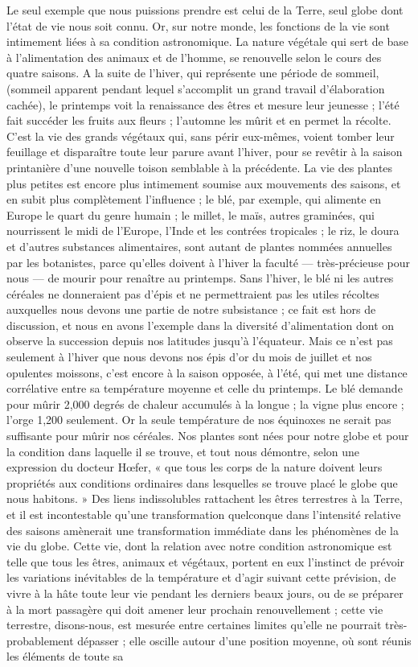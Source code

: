 \documentclass[a4paper, 11pt, oneside, landscape]{article}
\begin{document}
Le seul exemple que nous puissions prendre est celui de la Terre, seul globe dont l'état de vie nous soit connu. Or, sur notre monde, les fonctions de la vie sont intimement liées à sa condition astronomique. La nature végétale qui sert de base à l'alimentation des animaux et de l'homme, se renouvelle selon le cours des quatre saisons. A la suite de l'hiver, qui représente une période de sommeil, (sommeil apparent pendant lequel s'accomplit un grand travail d'élaboration cachée), le printemps voit la renaissance des êtres et mesure leur jeunesse ; l'été fait succéder les fruits aux fleurs ; l'automne les mûrit et en permet la récolte. C'est la vie des grands végétaux qui, sans périr eux-mêmes, voient tomber leur feuillage et disparaître toute leur parure avant l'hiver, pour se revêtir à la saison printanière d'une nouvelle toison semblable à la précédente. La vie des plantes plus petites est encore plus intimement soumise aux mouvements des saisons, et en subit plus complètement l'influence ; le blé, par exemple, qui alimente en Europe le quart du genre humain ; le millet, le maïs, autres graminées, qui nourrissent le midi de l'Europe, l'Inde et les contrées tropicales ; le riz, le doura et d'autres substances alimentaires, sont autant de plantes nommées annuelles par les botanistes, parce qu'elles doivent à l'hiver la faculté --- très-précieuse pour nous --- de mourir pour renaître au printemps. Sans l'hiver, le blé ni les autres céréales ne donneraient pas d'épis et ne permettraient pas les utiles récoltes auxquelles nous devons une partie de notre subsistance ; ce fait est hors de discussion, et nous en avons l'exemple dans la diversité d'alimentation dont on observe la succession depuis nos latitudes jusqu'à l'équateur. Mais ce n'est pas seulement à l'hiver que nous devons nos épis d'or du mois de juillet et nos opulentes moissons, c'est encore à la saison opposée, à l'été, qui met une distance corrélative entre sa température moyenne et celle du printemps. Le blé demande pour mûrir 2,000 degrés de chaleur accumulés à la longue ; la vigne plus encore ; l'orge 1,200 seulement. Or la seule température de nos équinoxes ne serait pas suffisante pour mûrir nos céréales. Nos plantes sont nées pour notre globe et pour la condition dans laquelle il se trouve, et tout nous démontre, selon une expression du docteur Hœfer, « que tous les corps de la nature doivent leurs propriétés aux conditions ordinaires dans lesquelles se trouve placé le globe que nous habitons. » Des liens indissolubles rattachent les êtres terrestres à la Terre, et il est incontestable qu'une transformation quelconque dans l'intensité relative des saisons amènerait une transformation immédiate dans les phénomènes de la vie du globe. Cette vie, dont la relation avec notre condition astronomique est telle que tous les êtres, animaux et végétaux, portent en eux l'instinct de prévoir les variations inévitables de la température et d'agir suivant cette prévision, de vivre à la hâte toute leur vie pendant les derniers beaux jours, ou de se préparer à la mort passagère qui doit amener leur prochain renouvellement ; cette vie terrestre, disons-nous, est mesurée entre certaines limites qu'elle ne pourrait très-probablement dépasser ; elle oscille autour d'une position moyenne, où sont réunis les éléments de toute sa 
\end{document}
